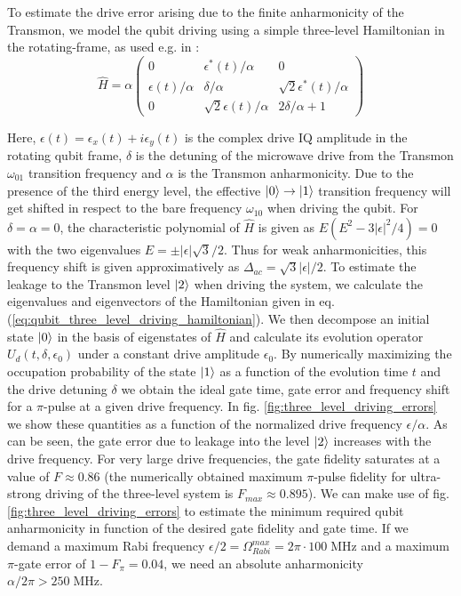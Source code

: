 \smallskip

To estimate the drive error arising due to the finite anharmonicity of the Transmon, we model the qubit driving using a simple three-level Hamiltonian in the rotating-frame, as used e.g. in \cite{motzoi_simple_2009}:
%
\begin{equation}
\hat{H} = \alpha\left(
						 \begin{array}{ccc}
						0 & \epsilon^*(t)/\alpha & 0 \\
						\epsilon(t)/\alpha & \delta/\alpha & \sqrt{2}\epsilon^*(t)/\alpha \\
						0 & \sqrt{2}\epsilon(t)/\alpha & 2\delta/\alpha + 1
						\end{array}
					\right) \label{eq:qubit_three_level_driving_hamiltonian}
\end{equation}
%

Here, $\epsilon(t) = \epsilon_x(t)+i\epsilon_y(t)$ is the complex drive IQ amplitude in the rotating qubit frame, $\delta$ is the detuning of the microwave drive from the Transmon $\omega_{01}$ transition frequency and $\alpha$ is the Transmon anharmonicity. Due to the presence of the third energy level, the effective $\left| 0 \right>\to\left| 1 \right>$ transition frequency will get shifted in respect to the bare frequency $\omega_{10}$ when driving the qubit. For $\delta = \alpha = 0$, the characteristic polynomial of $\hat{H}$ is given as $E(E^2-3|\epsilon|^2/4) = 0$ with the two eigenvalues $E=\pm |\epsilon|\sqrt{3}/2$. Thus for weak anharmonicities, this frequency shift is given approximatively as $\Delta_{ac}=\sqrt{3}|\epsilon|/2$. To estimate the leakage to the Transmon level $\left| 2 \right>$ when driving the system, we calculate the eigenvalues and eigenvectors of the Hamiltonian given in eq. (\ref{eq:qubit_three_level_driving_hamiltonian}). We then decompose an initial state $\left| 0 \right>$ in the basis of eigenstates of $\hat{H}$ and calculate its evolution operator $U_d(t,\delta,\epsilon_0)$ under a constant drive amplitude $\epsilon_0$. By numerically maximizing the occupation probability of the state $\left| 1 \right>$ as a function of the evolution time $t$ and the drive detuning $\delta$ we obtain the ideal gate time, gate error and frequency shift for a $\pi$-pulse at a given drive frequency. In fig. \ref{fig:three_level_driving_errors} we show these quantities as a function of the normalized drive frequency $\epsilon/\alpha$. As can be seen, the gate error due to leakage into the level $\left| 2 \right>$ increases with the drive frequency. For very large drive frequencies, the gate fidelity saturates at a value of $F\approx 0.86$ (the numerically obtained maximum $\pi$-pulse fidelity for ultra-strong driving of the three-level system is $F_{max}\approx 0.895$). We can make use of fig. \ref{fig:three_level_driving_errors} to estimate the minimum required qubit anharmonicity in function of the desired gate fidelity and gate time. If we demand a maximum Rabi frequency $\epsilon/2=\Omega_{Rabi}^{max}=2\pi\cdot 100\;\mathrm{MHz}$ and a maximum $\pi$-gate error of $1-F_\pi = 0.04$, we need an absolute anharmonicity $\alpha/2\pi > 250\;\mathrm{MHz}$.

